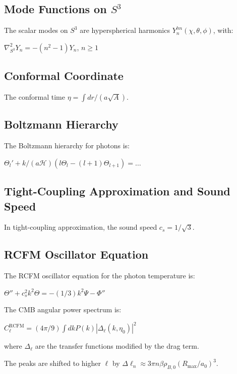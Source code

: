 \documentclass[10pt,twocolumn]{article}
\theoremstyle{definition}
\newcommand{\Rmax}{R_{\max}}
\newcommand{\Hcal}{\mathcal{H}}
\begin{document}
\subsection{Mode Functions on \( S^{3} \)}

The scalar modes on \( S^{3} \) are hyperspherical harmonics \( Y_{n}^{lm} (\chi, \theta, \phi) \), with:

\( \nabla^{2}_{S^{3}} Y_{n} = - (n^{2} - 1) Y_{n} \), \( n \geq 1 \)

\subsection{Conformal Coordinate}

The conformal time \( \eta = \int dr / (a \sqrt{A}) \).

\subsection{Boltzmann Hierarchy}

The Boltzmann hierarchy for photons is:

\( \Theta_{l}' + k / (a \Hcal) (l \Theta_{l} - (l+1) \Theta_{l+1}) = \dots \)

\subsection{Tight-Coupling Approximation and Sound Speed}

In tight-coupling approximation, the sound speed \( c_{s} = 1 / \sqrt{3} \).

\subsection{RCFM Oscillator Equation}

The RCFM oscillator equation for the photon temperature is:

\( \Theta'' + c_{s}^{2} k^{2} \Theta = - (1/3) k^{2} \Psi - \Phi'' \)

The CMB angular power spectrum is:

\( C_{\ell}^{\mathrm{RCFM}} = (4 \pi / 9) \int dk P(k) |\Delta_{\ell}(k, \eta_{0})|^{2} \)

where \( \Delta_{\ell} \) are the transfer functions modified by the drag term.

The peaks are shifted to higher \( \ell \) by \( \Delta \ell_{n} \approx 3 \pi n \beta \rho_{B,0} (\Rmax / a_{0})^{3} \).

\end{document}
